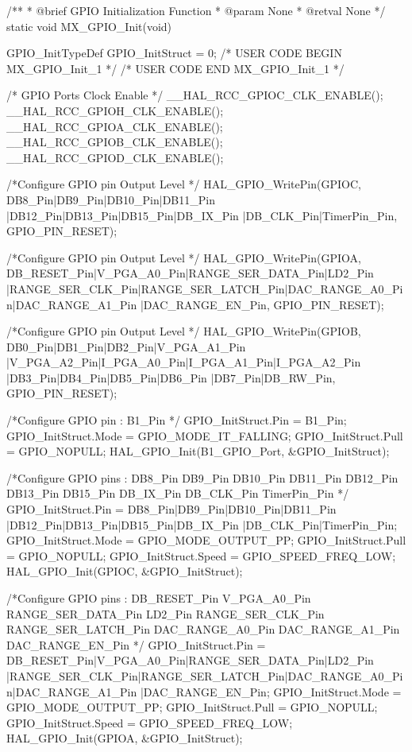 /**
  * @brief GPIO Initialization Function
  * @param None
  * @retval None
  */
static void MX_GPIO_Init(void)
{
  GPIO_InitTypeDef GPIO_InitStruct = {0};
/* USER CODE BEGIN MX_GPIO_Init_1 */
/* USER CODE END MX_GPIO_Init_1 */

  /* GPIO Ports Clock Enable */
  __HAL_RCC_GPIOC_CLK_ENABLE();
  __HAL_RCC_GPIOH_CLK_ENABLE();
  __HAL_RCC_GPIOA_CLK_ENABLE();
  __HAL_RCC_GPIOB_CLK_ENABLE();
  __HAL_RCC_GPIOD_CLK_ENABLE();

  /*Configure GPIO pin Output Level */
  HAL_GPIO_WritePin(GPIOC, DB8_Pin|DB9_Pin|DB10_Pin|DB11_Pin
                          |DB12_Pin|DB13_Pin|DB15_Pin|DB_IX_Pin
                          |DB_CLK_Pin|TimerPin_Pin, GPIO_PIN_RESET);

  /*Configure GPIO pin Output Level */
  HAL_GPIO_WritePin(GPIOA, DB_RESET_Pin|V_PGA_A0_Pin|RANGE_SER_DATA_Pin|LD2_Pin
                          |RANGE_SER_CLK_Pin|RANGE_SER_LATCH_Pin|DAC_RANGE_A0_Pin|DAC_RANGE_A1_Pin
                          |DAC_RANGE_EN_Pin, GPIO_PIN_RESET);

  /*Configure GPIO pin Output Level */
  HAL_GPIO_WritePin(GPIOB, DB0_Pin|DB1_Pin|DB2_Pin|V_PGA_A1_Pin
                          |V_PGA_A2_Pin|I_PGA_A0_Pin|I_PGA_A1_Pin|I_PGA_A2_Pin
                          |DB3_Pin|DB4_Pin|DB5_Pin|DB6_Pin
                          |DB7_Pin|DB_RW_Pin, GPIO_PIN_RESET);

  /*Configure GPIO pin : B1_Pin */
  GPIO_InitStruct.Pin = B1_Pin;
  GPIO_InitStruct.Mode = GPIO_MODE_IT_FALLING;
  GPIO_InitStruct.Pull = GPIO_NOPULL;
  HAL_GPIO_Init(B1_GPIO_Port, &GPIO_InitStruct);

  /*Configure GPIO pins : DB8_Pin DB9_Pin DB10_Pin DB11_Pin
                           DB12_Pin DB13_Pin DB15_Pin DB_IX_Pin
                           DB_CLK_Pin TimerPin_Pin */
  GPIO_InitStruct.Pin = DB8_Pin|DB9_Pin|DB10_Pin|DB11_Pin
                          |DB12_Pin|DB13_Pin|DB15_Pin|DB_IX_Pin
                          |DB_CLK_Pin|TimerPin_Pin;
  GPIO_InitStruct.Mode = GPIO_MODE_OUTPUT_PP;
  GPIO_InitStruct.Pull = GPIO_NOPULL;
  GPIO_InitStruct.Speed = GPIO_SPEED_FREQ_LOW;
  HAL_GPIO_Init(GPIOC, &GPIO_InitStruct);

  /*Configure GPIO pins : DB_RESET_Pin V_PGA_A0_Pin RANGE_SER_DATA_Pin LD2_Pin
                           RANGE_SER_CLK_Pin RANGE_SER_LATCH_Pin DAC_RANGE_A0_Pin DAC_RANGE_A1_Pin
                           DAC_RANGE_EN_Pin */
  GPIO_InitStruct.Pin = DB_RESET_Pin|V_PGA_A0_Pin|RANGE_SER_DATA_Pin|LD2_Pin
                          |RANGE_SER_CLK_Pin|RANGE_SER_LATCH_Pin|DAC_RANGE_A0_Pin|DAC_RANGE_A1_Pin
                          |DAC_RANGE_EN_Pin;
  GPIO_InitStruct.Mode = GPIO_MODE_OUTPUT_PP;
  GPIO_InitStruct.Pull = GPIO_NOPULL;
  GPIO_InitStruct.Speed = GPIO_SPEED_FREQ_LOW;
  HAL_GPIO_Init(GPIOA, &GPIO_InitStruct);

}
